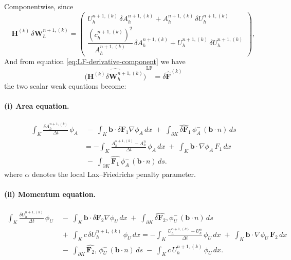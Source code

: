\documentclass[11pt]{article}
\begin{document}
Componentwise, since
\[
  \mathbf{H}^{(k)}\,\delta\mathbf{W}_h^{n+1,(k)}
  =
  \begin{pmatrix}
    U_h^{n+1,(k)}\,\delta A_h^{n+1,(k)}
    + A_h^{n+1,(k)}\,\delta U_h^{n+1,(k)} \\[2mm]
    \dfrac{(c_h^{n+1,(k)})^{2}}{A_h^{n+1,(k)}}\,\delta A_h^{n+1,(k)}
    + U_h^{n+1,(k)}\,\delta U_h^{n+1,(k)}
  \end{pmatrix},
\]
And from equation \eqref{eq:LF-derivative-component} we have
\[ \widehat{\big(\mathbf{H}^{(k)}\delta\mathbf{W}_h^{n+1,(k)}\big)}^{\mathrm{LF}} = \delta\widehat{\mathbf{F}}^{(k)}
\]
the two scalar weak equations become:

\paragraph{(i) Area equation.}
\begin{align}
\int_K
  \frac{\delta A_h^{n+1,(k)}}{\Delta t}\,\phi_A
  &\;-\;
  \int_K
    \bm b\!\cdot\!
    \delta\mathbf{F}_1
    \nabla\phi_A\,dx
  \;+\;
  \int_{\partial K}
   \widehat{ \delta \mathbf{F}}_1\,
    \phi_A^{-}\,
    (\bm b\!\cdot\! n)\,ds
  \nonumber\\[4pt]
  &=
  -\int_K
    \frac{A_h^{n+1,(k)} - A_h^n}{\Delta t}\,\phi_A\,dx
  \;+\;
  \int_K
    \bm b\!\cdot\!\nabla\phi_A\,
   F_1 \,dx
    \nonumber\\[4pt]
 & \;-\; 
 \int_{\partial K}
    \widehat{\mathbf{F_1}}\,
    \phi_A^{-}\,
    (\bm b\!\cdot\! n)\,ds.
  \label{eq:newton-A-nk1}
\end{align}
where $\alpha$ denotes the local Lax--Friedrichs penalty parameter.

\vspace{1em}

\paragraph{(ii) Momentum equation.}

\begin{align}
\int_K
  \frac{\delta U_h^{n+1,(k)}}{\Delta t}\,\phi_U
  &\;-\;
  \int_K
    \bm b\!\cdot\!
    \delta\mathbf{F}_2
    \nabla\phi_U\,dx
  \;+\;
  \int_{\partial K}
    \widehat{\delta\mathbf{F}_2},
    \phi_U^{-}\,
    (\bm b\!\cdot\! n)\,ds  \nonumber\\[4pt]
  &
  \;+\;
  \int_K c\,\delta U_h^{n+1,(k)}\,\phi_U\,dx
  =
  -\int_K
    \frac{U_h^{n+1,(k)} - U_h^n}{\Delta t}\,\phi_U\,dx
  \;+\;
  \int_K
    \bm b\!\cdot\!\nabla\phi_U\,
    \mathbf{F}_2 \,dx \nonumber\\[4pt]
  &
  \;-\;
  \int_{\partial K}
     \widehat{\mathbf{F}_2},\,
    \phi_U^{-}\,
    (\bm b\!\cdot\! n)\,ds
  \;-\;
  \int_K c\,U_h^{n+1,(k)}\,\phi_U\,dx.
  \label{eq:newton-U-nk1}
\end{align}
\end{document}
